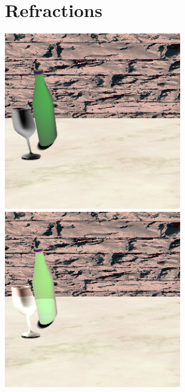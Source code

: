 \documentclass{article}
\begin{document}
\section{Refractions}
\includegraphics[width=3in]{Assets/no_refraction.png}
\includegraphics[width=3in]{Assets/refraction.png}
\end{document}
